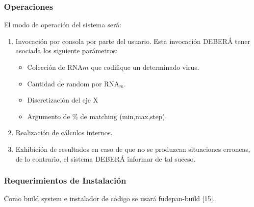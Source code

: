 \documentclass[12pt,a4paper,english,spanish]{article}
\begin{document}
	\subsubsection{Operaciones}
		El modo de operación del sistema será: 
		\begin{enumerate}
			\item Invocación por consola por parte del usuario. Esta invocación DEBERÁ tener asociada los siguiente parámetros:
				\begin{itemize}
					\item Colección de RNA$m$ que codifique un determinado virus.
					\item Cantidad de random por RNA$_m$.
					\item Discretización del eje X				
					\item Argumento de \% de matching (min,max,step).
				\end{itemize}
			\item Realización de cálculos internos.
			\item Exhibición de resultados en caso de que no se produzcan situaciones erroneas, de lo contrario, el sistema DEBERÁ informar de tal suceso.
		\end{enumerate}

	\subsubsection{Requerimientos de Instalación}
		Como build system e instalador de código se usará fudepan-build [15].
\end{document}
